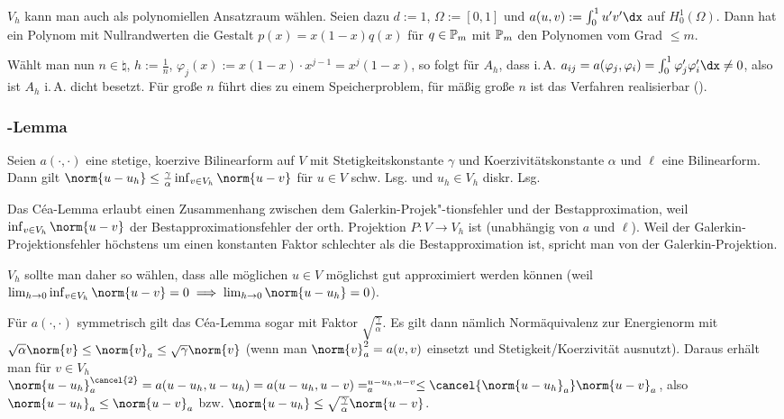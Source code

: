 \linie

\begin{Bsp}
    $V_h$ kann man auch als polynomiellen Ansatzraum wählen.
    Seien dazu $d := 1$, $\Omega := [0, 1]$ und
    $a(u, v) := \int_0^1 u'v' \dx$ auf $H^1_0(\Omega)$.
    Dann hat ein Polynom mit Nullrandwerten die Gestalt $p(x) = x(1-x)q(x)$ für $q \in \mathbb{P}_m$
    mit $\mathbb{P}_m$ den Polynomen vom Grad $\le m$.

    Wählt man nun $n \in \natural$, $h := \frac{1}{n}$,
    $\varphi_j(x) := x(1-x) \cdot x^{j-1} = x^j (1-x)$, so folgt für $A_h$, dass i.\,A.
    $a_{ij} = a(\varphi_j, \varphi_i) = \int_0^1 \varphi_j' \varphi_i' \dx \not= 0$,
    also ist $A_h$ i.\,A. dicht besetzt.
    Für große $n$ führt dies zu einem Speicherproblem,
    für mäßig große $n$ ist das Verfahren realisierbar ().
\end{Bsp}

\subsubsection{%
    -Lemma%
}

\begin{Lemma}{}
    Seien $a(\cdot, \cdot)$ eine stetige, koerzive Bilinearform auf $V$ mit
    Stetigkeitskonstante $\gamma$ und Koerzivitätskonstante $\alpha$
    und $\ell$ eine Bilinearform.\\
    Dann gilt $\norm{u - u_h} \le \frac{\gamma}{\alpha} \inf_{v \in V_h} \norm{u - v}$
    für $u \in V$ schw. Lsg. und $u_h \in V_h$ diskr. Lsg.
\end{Lemma}

\linie

\begin{Bem}
    Das Céa-Lemma erlaubt einen Zusammenhang zwischen dem Galerkin-Projek"-tionsfehler und
    der Bestapproximation, weil $\inf_{v \in V_h} \norm{u - v}$ der Bestapproximationsfehler
    der orth. Projektion $P\colon V \to V_h$ ist (unabhängig von $a$ und $\ell$).
    Weil der Galerkin-Projektionsfehler höchstens um einen konstanten Faktor schlechter als
    die Bestapproximation ist, spricht man von  der Galerkin-Projektion.

    $V_h$ sollte man daher so wählen,
    dass alle möglichen $u \in V$ möglichst gut approximiert werden können
    (weil $\lim_{h \to 0} \inf_{v \in V_h} \norm{u - v} = 0 \implies
    \lim_{h \to 0} \norm{u - u_h} = 0$).

    Für $a(\cdot, \cdot)$ symmetrisch gilt das Céa-Lemma sogar mit Faktor
    $\sqrt{\frac{\gamma}{\alpha}}$.
    Es gilt dann nämlich Normäquivalenz zur Energienorm mit
    $\sqrt{\alpha} \norm{v} \le \norm{v}_a \le \sqrt{\gamma} \norm{v}$
    (wenn man $\norm{v}_a^2 = a(v, v)$ einsetzt und Stetigkeit/Koerzivität ausnutzt).
    Daraus erhält man für $v \in V_h$\\
    $\norm{u - u_h}_a^{\cancel{2}} = a(u - u_h, u - u_h) = a(u - u_h, u - v) =
    \sp{u - u_h, u - v}_a \le \cancel{\norm{u - u_h}_a} \norm{u - v}_a$,
    also $\norm{u - u_h}_a \le \norm{u - v}_a$ bzw.
    $\norm{u - u_h} \le \sqrt{\frac{\gamma}{\alpha}} \norm{u - v}$.
\end{Bem}

